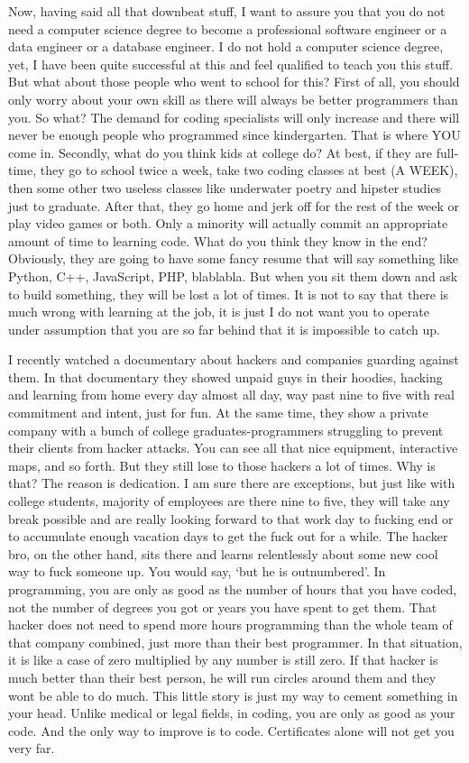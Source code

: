 \documentclass[]{book}
\begin{document}
Now, having said all that downbeat stuff, I want to assure you that you do not need a computer science degree to become a professional software engineer or a data engineer or a database engineer. I do not hold a computer science degree, yet, I have been quite successful at this and feel qualified to teach you this stuff. But what about those people who went to school for this? First of all, you should only worry about your own skill as there will always be better programmers than you. So what? The demand for coding specialists will only increase and there will never be enough people who programmed since kindergarten. That is where YOU come in. Secondly, what do you think kids at college do? At best, if they are full-time, they go to school twice a week, take two coding classes at best (A WEEK), then some other two useless classes like underwater poetry and hipster studies just to graduate. After that, they go home and jerk off for the rest of the week or play video games or both. Only a minority will actually commit an appropriate amount of time to learning code. What do you think they know in the end? Obviously, they are going to have some fancy resume that will say something like Python, C++, JavaScript, PHP, blablabla. But when you sit them down and ask to build something, they will be lost a lot of times. It is not to say that there is much wrong with learning at the job, it is just I do not want you to operate under assumption that you are so far behind that it is impossible to catch up.

I recently watched a documentary about hackers and companies guarding against them. In that documentary they showed unpaid guys in their hoodies, hacking and learning from home every day almost all day, way past nine to five with real commitment and intent, just for fun. At the same time, they show a private company with a bunch of college graduates-programmers struggling to prevent their clients from hacker attacks. You can see all that nice equipment, interactive maps, and so forth. But they still lose to those hackers a lot of times. Why is that? The reason is dedication. I am sure there are exceptions, but just like with college students, majority of employees are there nine to five, they will take any break possible and are really looking forward to that work day to fucking end or to accumulate enough vacation days to get the fuck out for a while. The hacker bro, on the other hand, sits there and learns relentlessly about some new cool way to fuck someone up. You would say, `but he is outnumbered'. In programming, you are only as good as the number of hours that you have coded, not the number of degrees you got or years you have spent to get them. That hacker does not need to spend more hours programming than the whole team of that company combined, just more than their best programmer. In that situation, it is like a case of zero multiplied by any number is still zero. If that hacker is much better than their best person, he will run circles around them and they wont be able to do much. This little story is just my way to cement something in your head. Unlike medical or legal fields, in coding, you are only as good as your code. And the only way to improve is to code. Certificates alone will not get you very far.
\end{document}
